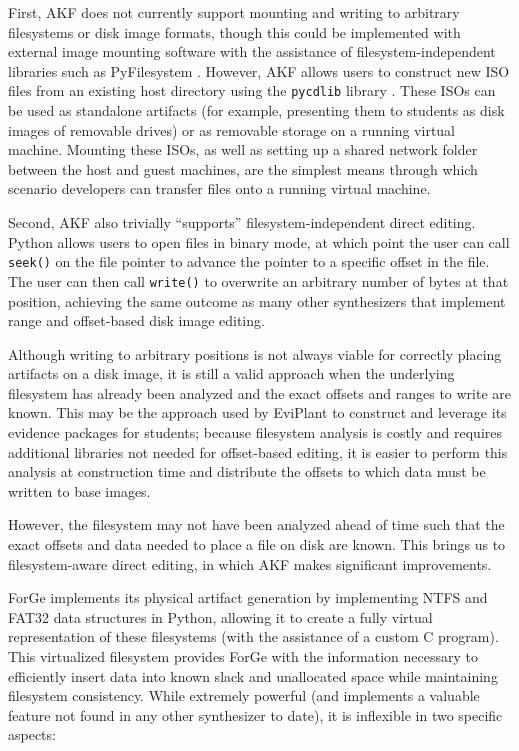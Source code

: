 \documentclass[letterpaper,12pt]{report}
\newcommand{\passthrough}[1]{#1}
\begin{document}
First, AKF does not currently support mounting and writing to arbitrary
filesystems or disk image formats, though this could be implemented with
external image mounting software with the assistance of
filesystem-independent libraries such as PyFilesystem
\cite{PyFilesystemPyfilesystem22025}. However, AKF allows users to
construct new ISO files from an existing host directory using the
\passthrough{\lstinline!pycdlib!} library
\cite{lalancetteClalancettePycdlib2025}. These ISOs can be used as
standalone artifacts (for example, presenting them to students as disk
images of removable drives) or as removable storage on a running virtual
machine. Mounting these ISOs, as well as setting up a shared network
folder between the host and guest machines, are the simplest means
through which scenario developers can transfer files onto a running
virtual machine.

Second, AKF also trivially ``supports'' filesystem-independent direct
editing. Python allows users to open files in binary mode, at which
point the user can call \passthrough{\lstinline!seek()!} on the file
pointer to advance the pointer to a specific offset in the file. The
user can then call \passthrough{\lstinline!write()!} to overwrite an
arbitrary number of bytes at that position, achieving the same outcome
as many other synthesizers that implement range and offset-based disk
image editing.

Although writing to arbitrary positions is not always viable for
correctly placing artifacts on a disk image, it is still a valid
approach when the underlying filesystem has already been analyzed and
the exact offsets and ranges to write are known. This may be the
approach used by EviPlant \cite{scanlonEviPlantEfficientDigital2017}
to construct and leverage its evidence packages for students; because
filesystem analysis is costly and requires additional libraries not
needed for offset-based editing, it is easier to perform this analysis
at construction time and distribute the offsets to which data must be
written to base images.

However, the filesystem may not have been analyzed ahead of time such
that the exact offsets and data needed to place a file on disk are
known. This brings us to filesystem-aware direct editing, in which AKF
makes significant improvements.

ForGe implements its physical artifact generation by implementing NTFS
and FAT32 data structures in Python, allowing it to create a fully
virtual representation of these filesystems (with the assistance of a
custom C program). This virtualized filesystem provides ForGe with the
information necessary to efficiently insert data into known slack and
unallocated space while maintaining filesystem consistency. While
extremely powerful (and implements a valuable feature not found in any
other synthesizer to date), it is inflexible in two specific aspects:
\end{document}
